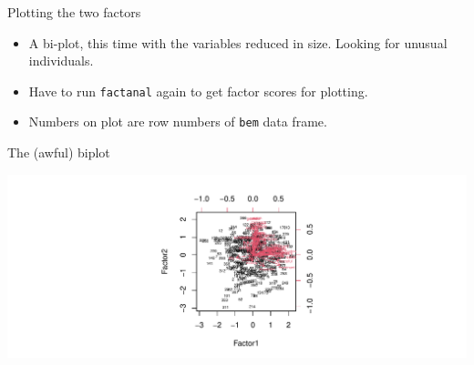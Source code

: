 \documentclass[
  ignorenonframetext,
]{beamer}
\newenvironment{Shaded}{\begin{snugshade}}{\end{snugshade}}
\newcommand{\DataTypeTok}[1]{\textcolor[rgb]{0.13,0.29,0.53}{#1}}
\newcommand{\DecValTok}[1]{\textcolor[rgb]{0.00,0.00,0.81}{#1}}
\newcommand{\FloatTok}[1]{\textcolor[rgb]{0.00,0.00,0.81}{#1}}
\newcommand{\KeywordTok}[1]{\textcolor[rgb]{0.13,0.29,0.53}{\textbf{#1}}}
\newcommand{\NormalTok}[1]{#1}
\newcommand{\OperatorTok}[1]{\textcolor[rgb]{0.81,0.36,0.00}{\textbf{#1}}}
\newcommand{\StringTok}[1]{\textcolor[rgb]{0.31,0.60,0.02}{#1}}
\providecommand{\tightlist}{%
  \setlength{\itemsep}{0pt}\setlength{\parskip}{0pt}}
\begin{document}
\begin{frame}[fragile]{Plotting the two factors}
\protect\hypertarget{plotting-the-two-factors}{}

\begin{itemize}
\item
  A bi-plot, this time with the variables reduced in size. Looking for
  unusual individuals.
\item
  Have to run \texttt{factanal} again to get factor scores for plotting.
\end{itemize}

\begin{Shaded}
\end{Shaded}

\begin{itemize}
\tightlist
\item
  Numbers on plot are row numbers of \texttt{bem} data frame.
\end{itemize}

\end{frame}

\begin{frame}{The (awful) biplot}
\protect\hypertarget{the-awful-biplot}{}

\includegraphics{slides_d29_files/figure-beamer/biplot-two-ag-1.pdf}

\end{frame}
\end{document}
